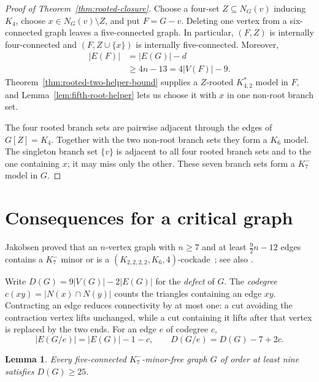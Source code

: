 \documentclass[11pt]{amsart}
\newtheorem{lemma}[theorem]{Lemma}
\begin{document}
\begin{proof}[Proof of Theorem~\ref{thm:rooted-closure}]
Choose a four-set $Z\subseteq N_G(v)$ inducing $K_4$, choose
$x\in N_G(v)\setminus Z$, and put $F=G-v$.  Deleting one vertex from a
six-connected graph leaves a five-connected graph.  In particular,
$(F,Z)$ is internally four-connected and $(F,Z\cup\{x\})$ is internally
five-connected.  Moreover,
\[
 \begin{aligned}
 |E(F)|&=|E(G)|-d\\
       &\geq4n-13
        =4|V(F)|-9.
 \end{aligned}                                          \tag{4.3}
\]
Theorem~\ref{thm:rooted-two-helper-bound} supplies a $Z$-rooted
$K^*_{4,2}$ model in $F$, and Lemma~\ref{lem:fifth-root-helper} lets us
choose it with $x$ in one non-root branch set.

The four rooted branch sets are pairwise adjacent through the edges of
$G[Z]=K_4$.  Together with the two non-root branch sets they form a $K_6$
model.  The singleton branch set $\{v\}$ is adjacent to all four rooted
branch sets and to the one containing $x$; it may miss only the other.
These seven branch sets form a $K_7^{-}$ model in $G$.
\end{proof}

\section{Consequences for a critical graph}

Jakobsen proved that an $n$-vertex graph with $n\geq7$ and at least
$\frac92n-12$ edges contains a $K_7^{-}$ minor or is a
$(K_{2,2,2,2},K_6,4)$-cockade~\cite[Theorem~4]{Jakobsen1983}; see also
\cite[Theorem~2]{Albar2014}.

Write $D(G)=9|V(G)|-2|E(G)|$ for the \emph{defect} of $G$.
The \emph{codegree} $c(xy)=|N(x)\cap N(y)|$ counts the triangles containing
an edge $xy$.  Contracting an edge reduces connectivity by at most one:
a cut avoiding the contraction vertex lifts unchanged, while a cut
containing it lifts after that vertex is replaced by the two ends.
For an edge $e$ of codegree $c$,
\begin{equation}\label{eq:contraction}
 |E(G/e)|=|E(G)|-1-c,\qquad D(G/e)=D(G)-7+2c.             \tag{5.1}
\end{equation}

\begin{lemma}\label{lem:jakobsen-defect}
Every five-connected $K_7^{-}$-minor-free graph $G$ of order at least nine
satisfies $D(G)\geq25$.
\end{lemma}
\end{document}

